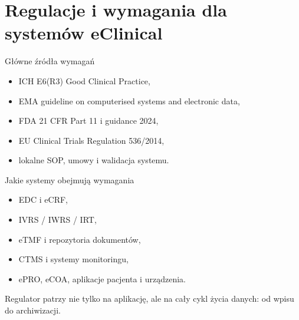\section{Regulacje i wymagania dla systemów eClinical}


\begin{frame}{Główne źródła wymagań}
  \begin{itemize}
    \item ICH E6(R3) Good Clinical Practice,
    \item EMA guideline on computerised systems and electronic data,
    \item FDA 21 CFR Part 11 i guidance 2024,
    \item EU Clinical Trials Regulation 536/2014,
    \item lokalne SOP, umowy i walidacja systemu.
  \end{itemize}
\end{frame}

\begin{frame}{Jakie systemy obejmują wymagania}
  \begin{itemize}
    \item EDC i eCRF,
    \item IVRS / IWRS / IRT,
    \item eTMF i repozytoria dokumentów,
    \item CTMS i systemy monitoringu,
    \item ePRO, eCOA, aplikacje pacjenta i urządzenia.
  \end{itemize}

  \vspace{0.3cm}

  \begin{ExampleBox}
    Regulator patrzy nie tylko na aplikację, ale na cały cykl życia danych: od wpisu do archiwizacji.
  \end{ExampleBox}
\end{frame}


